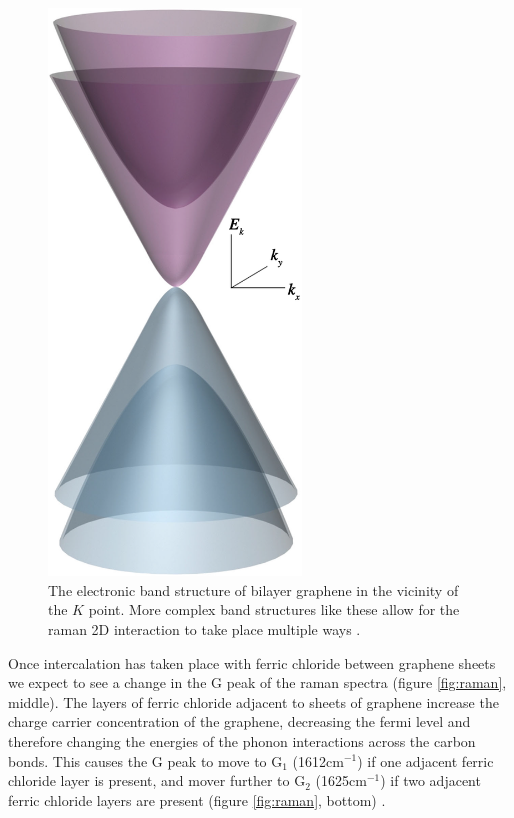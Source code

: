 \documentclass[12pt,titlepage]{article}
\begin{document}
\begin{figure}
\begin{minipage}[b]{0.45\linewidth}
			\includegraphics[width=0.6\textwidth]{figures/bilayer.png}
			\caption[The electronic band structure of bilayer graphene.]{The electronic band structure of bilayer graphene in the vicinity of the $K$ point. More complex band structures like these allow for the raman 2D interaction to take place multiple ways \cite{Novoselov2011}.}
			\label{fig:bilayer}
		\end{minipage}
	\end{figure}
	
	Once intercalation has taken place with ferric chloride between graphene sheets we expect to see a change in the G peak of the raman spectra (figure \ref{fig:raman}, middle). The layers of ferric chloride adjacent to sheets of graphene increase the charge carrier concentration of the graphene, decreasing the fermi level and therefore changing the energies of the phonon interactions across the carbon bonds. This causes the G peak to move to G$_1$ (1612cm$^{-1}$) if one adjacent ferric chloride layer is present, and mover further to G$_2$ (1625cm$^{-1}$) if two adjacent ferric chloride layers are present (figure \ref{fig:raman}, bottom) \cite{Khrapach2012a}.
	
\end{document}
